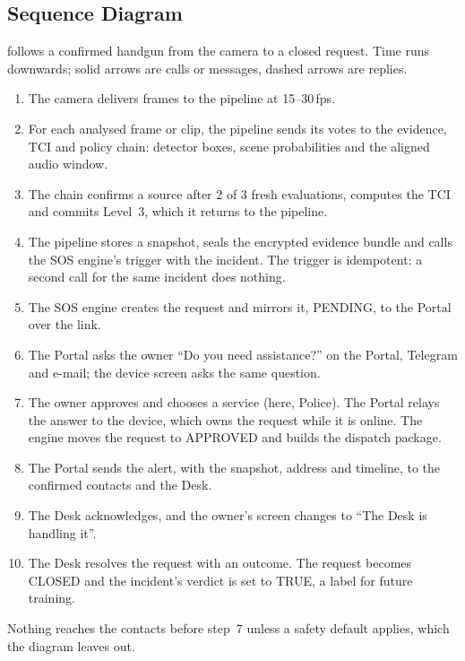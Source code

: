 \subsection{Sequence Diagram}
 follows a confirmed handgun from the camera to a closed request. Time runs downwards; solid arrows are calls or messages, dashed arrows are replies.
\begin{enumerate}
\item The camera delivers frames to the pipeline at 15--30\,fps.
\item For each analysed frame or clip, the pipeline sends its votes to the evidence, TCI and policy chain: detector boxes, scene probabilities and the aligned audio window.
\item The chain confirms a source after 2 of 3 fresh evaluations, computes the TCI and commits Level~3, which it returns to the pipeline.
\item The pipeline stores a snapshot, seals the encrypted evidence bundle and calls the SOS engine's trigger with the incident. The trigger is idempotent: a second call for the same incident does nothing.
\item The SOS engine creates the request and mirrors it, PENDING, to the Portal over the link.
\item The Portal asks the owner ``Do you need assistance?'' on the Portal, Telegram and e-mail; the device screen asks the same question.
\item The owner approves and chooses a service (here, Police). The Portal relays the answer to the device, which owns the request while it is online. The engine moves the request to APPROVED and builds the dispatch package.
\item The Portal sends the alert, with the snapshot, address and timeline, to the confirmed contacts and the Desk.
\item The Desk acknowledges, and the owner's screen changes to ``The Desk is handling it''.
\item The Desk resolves the request with an outcome. The request becomes CLOSED and the incident's verdict is set to TRUE, a label for future training.
\end{enumerate}
Nothing reaches the contacts before step~7 unless a safety default applies, which the diagram leaves out.

